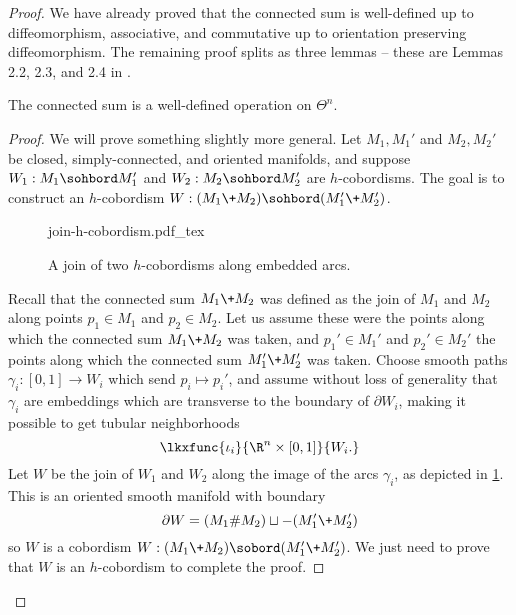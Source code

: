 \begin{proof}
	We have already proved that the connected sum is well-defined up to diffeomorphism, associative, and commutative up to orientation preserving diffeomorphism.  
	The remaining proof splits as three lemmas -- these are Lemmas 2.2, 2.3, and 2.4 in \cite{milnorkervaire1963groups}.

	\begin{lemma}
		The connected sum is a well-defined operation on $\Theta^n$.
	\end{lemma}
	\begin{proof}
		We will prove something slightly more general. Let $M_1, M_1'$ and $M_2, M_2'$ be closed, simply-connected, and oriented manifolds, and suppose $W_1 : M_1\sohbord M_1'$ and $W_2 : M_2\sohbord M_2'$ are $h$-cobordisms. The goal is to construct an $h$-cobordism $W : (M_1\+M_2)\sohbord (M_1'\+M_2')$.

		\begin{figure}[ht]
			\centering
			{join-h-cobordism.pdf_tex}
			\caption{A join of two $h$-cobordisms along embedded arcs.}\label{fig:connected-sum-of-h-cobordisms}
		\end{figure}

		Recall that the connected sum $M_1\+M_2$ was defined as the join of $M_1$ and $M_2$ along points $p_1\in M_1$ and $p_2\in M_2$. Let us assume these were the points along which the connected sum $M_1\+M_2$ was taken, and $p_1'\in M_1'$ and $p_2'\in M_2'$ the points along which the connected sum $M_1'\+M_2'$ was taken. Choose smooth paths $\gamma_i : [0,1] \to W_i$ which send $p_i\mapsto p_i'$, and assume without loss of generality that $\gamma_i$ are embeddings which are transverse to the boundary of $\partial W_i$, making it possible to get tubular neighborhoods
		\[
			\lkxfunc{\iota_i}{\R^n\times [0,1]}{W_i.}
		\]
		Let $W$ be the join of $W_1$ and $W_2$ along the image of the arcs $\gamma_i$, as depicted in \cref{fig:connected-sum-of-h-cobordisms}. This is an oriented smooth manifold with boundary
		\[
			\partial W = (M_1\#M_2)\sqcup -(M_1'\+M_2')
		\]
		so $W$ is a cobordism $W : (M_1\+M_2)\sobord (M_1'\+M_2')$. We just need to prove that $W$ is an $h$-cobordism to complete the proof.


\end{proof}
\end{proof}
